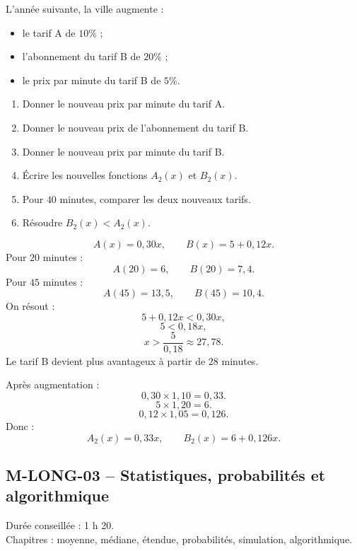 \begin{exercice}
L'année suivante, la ville augmente :
\begin{itemize}
  \item le tarif A de $10\%$ ;
  \item l'abonnement du tarif B de $20\%$ ;
  \item le prix par minute du tarif B de $5\%$.
\end{itemize}

\begin{enumerate}
  \item Donner le nouveau prix par minute du tarif A.
  \item Donner le nouveau prix de l'abonnement du tarif B.
  \item Donner le nouveau prix par minute du tarif B.
  \item Écrire les nouvelles fonctions $A_2(x)$ et $B_2(x)$.
  \item Pour $40$ minutes, comparer les deux nouveaux tarifs.
  \item Résoudre $B_2(x)<A_2(x)$.
\end{enumerate}
\end{exercice}

\begin{correction}
\[
A(x)=0{,}30x,\qquad B(x)=5+0{,}12x.
\]
Pour $20$ minutes :
\[
A(20)=6,\qquad B(20)=7{,}4.
\]
Pour $45$ minutes :
\[
A(45)=13{,}5,\qquad B(45)=10{,}4.
\]
On résout :
\[
5+0{,}12x<0{,}30x,
\]
\[
5<0{,}18x,
\]
\[
x>\frac{5}{0{,}18}\approx 27{,}78.
\]
Le tarif B devient plus avantageux à partir de $28$ minutes.

Après augmentation :
\[
0{,}30\times1{,}10=0{,}33.
\]
\[
5\times1{,}20=6.
\]
\[
0{,}12\times1{,}05=0{,}126.
\]
Donc :
\[
A_2(x)=0{,}33x,\qquad B_2(x)=6+0{,}126x.
\]
\end{correction}

\newpage

\subsection{M-LONG-03 -- Statistiques, probabilités et algorithmique}

\begin{objectif}
Durée conseillée : 1 h 20.\\
Chapitres : moyenne, médiane, étendue, probabilités, simulation, algorithmique.
\end{objectif}

